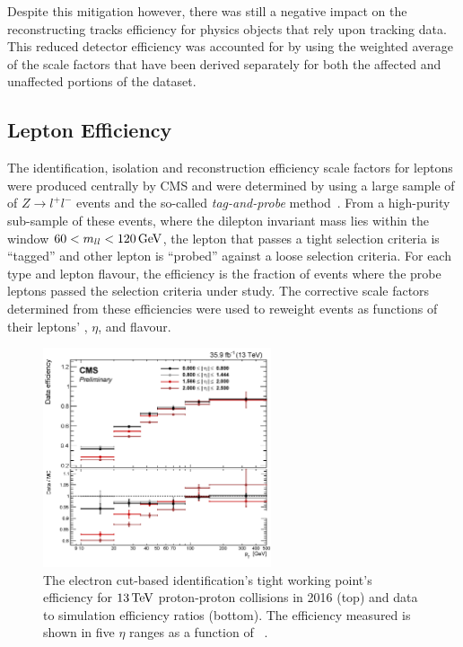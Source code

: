 Despite this mitigation however, there was still a negative impact on the reconstructing tracks efficiency for physics objects that rely upon tracking data.
This reduced detector efficiency was accounted for by using the weighted average of the scale factors that have been derived separately for both the affected and unaffected portions of the dataset.

\subsection{Lepton Efficiency}\label{subsec:leptonRecoSFs}
The identification, isolation and reconstruction efficiency scale factors for leptons were produced centrally by CMS and were determined by using a large sample of of $Z \rightarrow l^{+} l ^{-}$ events and the so-called \emph{tag-and-probe} method~\cite{CMS:2008rxa}.
From a high-purity sub-sample of these events, where the dilepton invariant mass lies within the window $60 < m_{ll} < 120 \,\text{Ge\hspace{-.08em}V}$, the lepton that passes a tight selection criteria is ``tagged'' and other lepton is ``probed'' against a loose selection criteria.
For each type and lepton flavour, the efficiency is the fraction of events where the probe leptons passed the selection criteria under study.
The corrective scale factors determined from these efficiencies were used to reweight events as functions of their leptons' \pt, $\eta$, and flavour.

\begin{figure}[!ht]
\centering
\includegraphics[width=0.6\textwidth]{figs/background-estimation/simulationCorrections/electronTightIdEff.pdf}
\caption{
The electron cut-based identification's tight working point's efficiency for $13\,\text{Te\hspace{-.08em}V}$ proton-proton collisions in 2016 (top) and data to simulation efficiency ratios (bottom). The efficiency measured is shown in five $\eta$ ranges as a function of \pT~\cite{CMS-DP-2017-004}.
}
\label{fig:electronIdEff}
\end{figure}

